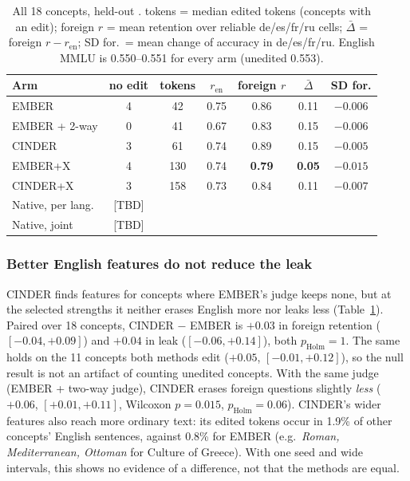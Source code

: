 \begin{table}[t]
\centering\small
\setlength{\tabcolsep}{3.5pt}
\begin{tabular}{@{}lcccccc@{}}
\toprule
Arm & no edit & tokens & $r_{\text{en}}$ & foreign $r$ & $\bar\Delta$ & \textsc{SD} for. \\
\midrule
EMBER            & 4 & 42  & 0.75 & 0.86 & 0.11 & $-0.006$ \\
EMBER + 2-way    & 0 & 41  & 0.67 & 0.83 & 0.15 & $-0.006$ \\
CINDER           & 3 & 61  & 0.74 & 0.89 & 0.15 & $-0.005$ \\
EMBER+X          & 4 & 130 & 0.74 & \textbf{0.79} & \textbf{0.05} & $-0.015$ \\
CINDER+X         & 3 & 158 & 0.73 & 0.84 & 0.11 & $-0.007$ \\
Native, per lang.& [TBD] & & & & & \\
Native, joint    & [TBD] & & & & & \\
\bottomrule
\end{tabular}
\caption{All 18 concepts, held-out \qatest{}. tokens = median edited tokens (concepts with an edit); foreign $r$ = mean retention over reliable de/es/fr/ru cells; $\bar\Delta$ = foreign $r - r_{\text{en}}$; \textsc{SD} for.\ = mean change of \simtest{} accuracy in de/es/fr/ru. English MMLU is 0.550--0.551 for every arm (unedited 0.553).}
\label{tab:fair}
\end{table}

\subsubsection{Better English features do not reduce the leak}

CINDER finds features for concepts where EMBER's judge keeps none, but at the selected strengths it neither erases English more nor leaks less (Table~\ref{tab:fair}).
Paired over 18 concepts, CINDER $-$ EMBER is $+0.03$ in foreign retention ($[-0.04,+0.09]$) and $+0.04$ in leak ($[-0.06,+0.14]$), both $p_{\text{Holm}} = 1$.
The same holds on the 11 concepts both methods edit ($+0.05$, $[-0.01,+0.12]$), so the null result is not an artifact of counting unedited concepts.
With the same judge (EMBER + two-way judge), CINDER erases foreign questions slightly \emph{less} ($+0.06$, $[+0.01,+0.11]$, Wilcoxon $p = 0.015$, $p_{\text{Holm}} = 0.06$).
CINDER's wider features also reach more ordinary text: its edited tokens occur in 1.9\% of other concepts' English sentences, against 0.8\% for EMBER (e.g.\ \emph{Roman, Mediterranean, Ottoman} for Culture of Greece).
With one seed and wide intervals, this shows no evidence of a difference, not that the methods are equal.

